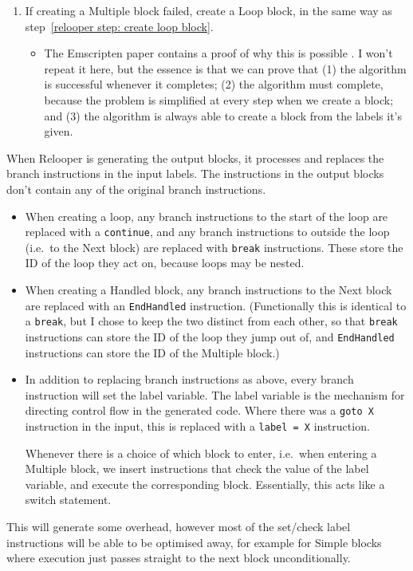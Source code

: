 \documentclass[10pt, a4paper]{article}
\begin{document}
\begin{enumerate}[label=\boxed{\arabic*}]
\item
If creating a Multiple block failed, create a Loop block, in the same way as step~\ref{relooper step: create loop block}.

\begin{itemize}
\item The Emscripten paper contains a proof of why this is possible \cite[10]{emscripten}.
I won't repeat it here, but the essence is that we can prove that (1) the algorithm is successful whenever it completes; (2) the algorithm must complete, because the problem is simplified at every step when we create a block; and (3) the algorithm is always able to create a block from the labels it's given.
\end{itemize}

\end{enumerate}


When Relooper is generating the output blocks, it processes and replaces the branch instructions in the input labels.
The instructions in the output blocks don't contain any of the original branch instructions.

\begin{itemize}
\item When creating a loop, any branch instructions to the start of the loop are replaced with a \texttt{continue}, and any branch instructions to outside the loop (i.e.\ to the Next block) are replaced with \texttt{break} instructions. These store the ID of the loop they act on, because loops may be nested.

\item When creating a Handled block, any branch instructions to the Next block are replaced with an \texttt{EndHandled} instruction. (Functionally this is identical to a \texttt{break}, but I chose to keep the two distinct from each other, so that \texttt{break} instructions can store the ID of the loop they jump out of, and \texttt{EndHandled} instructions can store the ID of the Multiple block.)

\item In addition to replacing branch instructions as above, every branch instruction will set the label variable.
The label variable is the mechanism for directing control flow in the generated code.
Where there was a \texttt{goto X} instruction in the input, this is replaced with a \texttt{label = X} instruction.

Whenever there is a choice of which block to enter, i.e.\ when entering a Multiple block, we insert instructions that check the value of the label variable, and execute the corresponding block.
Essentially, this acts like a switch statement.
\end{itemize}

This will generate some overhead, however most of the set/check label instructions will be able to be optimised away, for example for Simple blocks where execution just passes straight to the next block unconditionally.

\printbibliography
\end{document}
